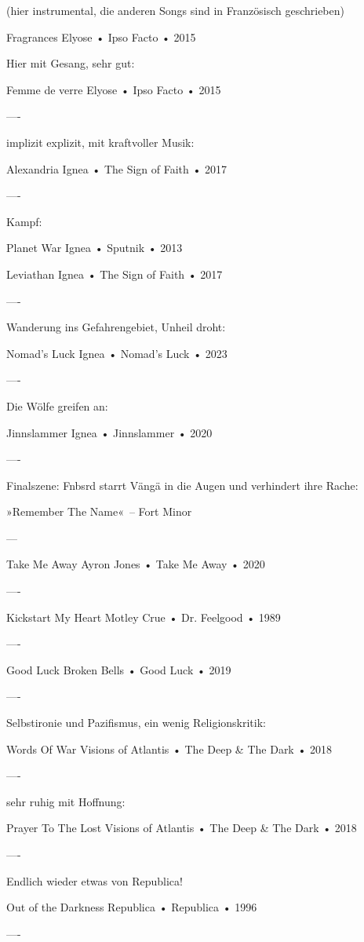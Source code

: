 (hier instrumental, die anderen Songs sind in Französisch geschrieben)

Fragrances
Elyose
 •
Ipso Facto
 • 2015

Hier mit Gesang, sehr gut:

Femme de verre
Elyose
 •
Ipso Facto
 • 2015

----

implizit explizit, mit kraftvoller Musik:

Alexandria
Ignea
 •
The Sign of Faith
 • 2017

----

Kampf:

Planet War
Ignea
 •
Sputnik
 • 2013


Leviathan
Ignea
 •
The Sign of Faith
 • 2017

----

Wanderung ins Gefahrengebiet, Unheil droht:

Nomad's Luck
Ignea
 •
Nomad's Luck
 • 2023

----

Die Wölfe greifen an:

Jinnslammer
Ignea
 •
Jinnslammer
 • 2020

----

Finalszene: Fnbsrd starrt Vängä in die Augen und verhindert ihre Rache:

»Remember The Name«~– Fort Minor

---

Take Me Away
Ayron Jones
 •
Take Me Away
 • 2020

----

Kickstart My Heart
Motley Crue
 •
Dr. Feelgood
 • 1989

----

Good Luck
Broken Bells
 •
Good Luck
 • 2019

----

Selbstironie und Pazifismus, ein wenig Religionskritik:

Words Of War
Visions of Atlantis
 •
The Deep & The Dark
 • 2018

----

sehr ruhig mit Hoffnung:

Prayer To The Lost
Visions of Atlantis
 •
The Deep & The Dark
 • 2018

----

Endlich wieder etwas von Republica!


Out of the Darkness
Republica
 •
Republica
 • 1996

----

